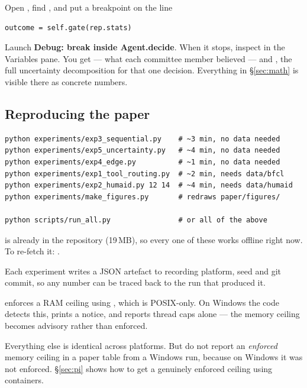 \begin{keybox}
Open , find , and put a breakpoint
on the line
\begin{lstlisting}[style=py]
outcome = self.gate(rep.stats)
\end{lstlisting}
Launch \textbf{Debug: break inside Agent.decide}. When it stops, inspect
 in the Variables pane. You get  --- what each
committee member believed --- and , the full uncertainty
decomposition for that one decision. Everything in \S\ref{sec:math} is visible
there as concrete numbers.
\end{keybox}

\subsection{Reproducing the paper}

\begin{codebox}
\begin{lstlisting}[style=shell]
python experiments/exp3_sequential.py    # ~3 min, no data needed
python experiments/exp5_uncertainty.py   # ~4 min, no data needed
python experiments/exp4_edge.py          # ~1 min, no data needed
python experiments/exp1_tool_routing.py  # ~2 min, needs data/bfcl
python experiments/exp2_humaid.py 12 14  # ~4 min, needs data/humaid
python experiments/make_figures.py       # redraws paper/figures/

python scripts/run_all.py                # or all of the above
\end{lstlisting}
\end{codebox}

\noindent {} is already in the repository (19\,MB), so every one of
these works offline right now. To re-fetch it: .

Each experiment writes a JSON artefact to  recording platform,
seed and git commit, so any number can be traced back to the run that produced it.

\begin{warnbox}
 enforces a RAM ceiling using , which is
POSIX-only. On Windows the code detects this, prints a notice, and reports
thread caps alone --- the memory ceiling becomes advisory rather than enforced.

Everything else is identical across platforms. But do not report an
\emph{enforced} memory ceiling in a paper table from a Windows run, because on
Windows it was not enforced. \S\ref{sec:pi} shows how to get a genuinely
enforced ceiling using containers.
\end{warnbox}

